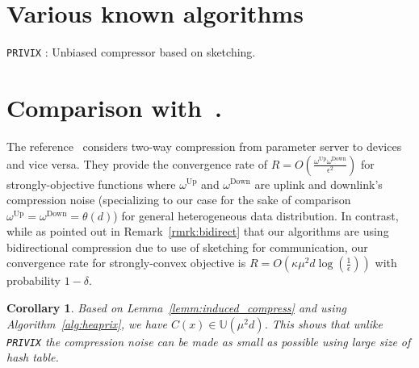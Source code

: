 \documentclass[twoside]{article}
\newcommand{\todo}[1]{\textcolor{red}{ToDo:~#1}}
\newtheorem{corollary}{Corollary}
\begin{document}
\section{Various known algorithms}

\begin{algorithm}[H]
\caption{\texttt{PRIVIX} \cite{li2019privacy}: Unbiased compressor based on sketching. }\label{Alg:privix}
\begin{algorithmic}[1]
\vspace{- 0.1cm}
\end{algorithmic}
\end{algorithm}


\section{Comparison with~\cite{philippenko2020artemis}.} 

The reference~\cite{philippenko2020artemis} considers two-way compression from parameter server to devices and vice versa. They provide the convergence rate of $R=O\left(\frac{\omega^{\text{Up}}\omega^{\text{Down}}}{\epsilon^2}\right)$ for strongly-objective functions where $\omega^{\text{Up}}$ and $\omega^{\text{Down}}$ are uplink and downlink's compression noise (specializing to our case for the sake of comparison $\omega^{\text{Up}}=\omega^{\text{Down}}=\theta\left(d\right)$) for general heterogeneous data distribution. In contrast, while as pointed out in Remark~\ref{rmrk:bidirect} that our algorithms are using bidirectional compression due to use of sketching for communication, our convergence rate for strongly-convex objective is $R=O(\kappa\mu^2d\log\left(\frac{1}{\epsilon}\right))$ with probability $1-\delta$.  



\begin{corollary}
Based on Lemma~\ref{lemm:induced_compress} and using Algorithm~\ref{alg:heaprix}, we have $C(x)\in \mathbb{U}(\mu^2 d)$. This shows that unlike \texttt{PRIVIX} the compression noise can be made as small as possible using large size of hash table.
\end{corollary}
\end{document}
